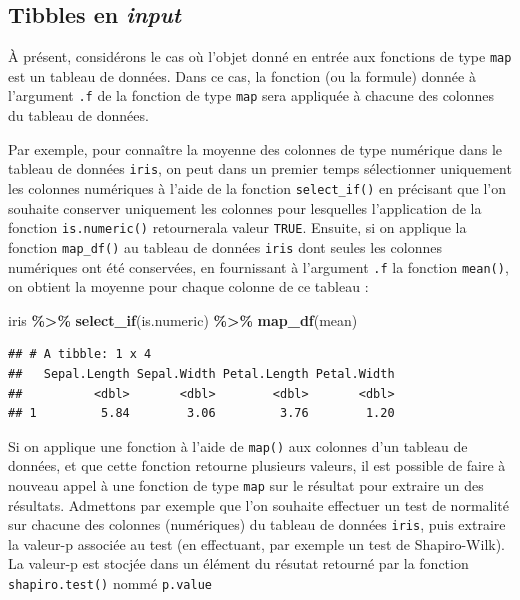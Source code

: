 \documentclass[
  11pt,
]{book}
\newenvironment{Shaded}{\begin{snugshade}}{\end{snugshade}}
\newcommand{\KeywordTok}[1]{\textcolor[rgb]{0.13,0.29,0.53}{\textbf{#1}}}
\newcommand{\NormalTok}[1]{#1}
\newcommand{\OperatorTok}[1]{\textcolor[rgb]{0.81,0.36,0.00}{\textbf{#1}}}
\newcommand{\StringTok}[1]{\textcolor[rgb]{0.31,0.60,0.02}{#1}}
\numberwithin{equation}{section}
\numberwithin{countremarque}{section}
\begin{document}
\hypertarget{tibbles-en-input}{%
\subsection{\texorpdfstring{Tibbles en \emph{input}}{Tibbles en input}}\label{tibbles-en-input}}

À présent, considérons le cas où l'objet donné en entrée aux fonctions de type \texttt{map} est un tableau de données. Dans ce cas, la fonction (ou la formule) donnée à l'argument \texttt{.f} de la fonction de type \texttt{map} sera appliquée à chacune des colonnes du tableau de données.

Par exemple, pour connaître la moyenne des colonnes de type numérique dans le tableau de données \texttt{iris}, on peut dans un premier temps sélectionner uniquement les colonnes numériques à l'aide de la fonction \texttt{select\_if()} en précisant que l'on souhaite conserver uniquement les colonnes pour lesquelles l'application de la fonction \texttt{is.numeric()} retournerala valeur \texttt{TRUE}. Ensuite, si on applique la fonction \texttt{map\_df()} au tableau de données \texttt{iris} dont seules les colonnes numériques ont été conservées, en fournissant à l'argument \texttt{.f} la fonction \texttt{mean()}, on obtient la moyenne pour chaque colonne de ce tableau :

\begin{Shaded}
\begin{Highlighting}[]
\NormalTok{iris }\OperatorTok{\%\textgreater{}\%}\StringTok{ }
\StringTok{  }\KeywordTok{select\_if}\NormalTok{(is.numeric) }\OperatorTok{\%\textgreater{}\%}\StringTok{ }
\StringTok{  }\KeywordTok{map\_df}\NormalTok{(mean)}
\end{Highlighting}
\end{Shaded}

\begin{lstlisting}
## # A tibble: 1 x 4
##   Sepal.Length Sepal.Width Petal.Length Petal.Width
##          <dbl>       <dbl>        <dbl>       <dbl>
## 1         5.84        3.06         3.76        1.20
\end{lstlisting}

Si on applique une fonction à l'aide de \texttt{map()} aux colonnes d'un tableau de données, et que cette fonction retourne plusieurs valeurs, il est possible de faire à nouveau appel à une fonction de type \texttt{map} sur le résultat pour extraire un des résultats. Admettons par exemple que l'on souhaite effectuer un test de normalité sur chacune des colonnes (numériques) du tableau de données \texttt{iris}, puis extraire la valeur-p associée au test (en effectuant, par exemple un test de Shapiro-Wilk). La valeur-p est stocjée dans un élément du résutat retourné par la fonction \texttt{shapiro.test()} nommé \texttt{p.value}
\end{document}
